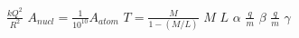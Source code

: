 \documentclass{article}
\begin{document}
$\frac{kQ^2}{R^2}$
$A_{nucl} = \frac{1}{10^{10}} A_{atom}$
$T = \frac{M}{1-(M/L)}$
$M$
$L$
$\alpha$
$\frac{q}{m}$
$\beta$
$\frac{q}{m}$
$\gamma$
\end{document}
